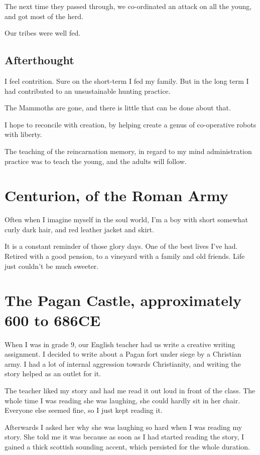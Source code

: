 The next time they passed through, we co-ordinated an attack on all the young, 
and got most of the herd. 

Our tribes were well fed. 

\section{Afterthought}

I feel contrition. Sure on the short-term I fed my family. But in the long term
I had contributed to an unsustainable hunting practice. 

The Mammoths are gone, and there is little that can be done about that. 

I hope to reconcile with creation, by helping create a genus of co-operative
robots with liberty. 

The teaching of the reincarnation memory, in regard to my mind administration
practice was to teach the young, and the adults will follow.
 
\chapter{Centurion, of the Roman Army}

Often when I imagine myself in the soul world, I'm a boy with short somewhat
curly dark hair, and red leather jacket and skirt. 

It is a constant reminder of those glory days. 
One of the best lives I've had. Retired with a good pension, to a vineyard with
a family and old friends. Life just couldn't be much sweeter. 

\chapter{The Pagan Castle, approximately 600 to 686CE}
When I was in grade 9, our English teacher had us write a creative writing
assignment. I decided to write about a Pagan fort under siege by a Christian
army.  I had a lot of internal aggression towards Christianity, and writing the
story helped as an outlet for it. 

The teacher liked my story and had me read it out loud in front of the class.
The whole time I was reading she was laughing, she could hardly sit in her
chair. Everyone else seemed fine, so I just kept reading it. 

Afterwards I asked her why she was laughing so hard when I was reading my story. 
She told me it was because as soon as I had started reading the story, I gained
a thick scottish sounding accent, which persisted for the whole duration. 

